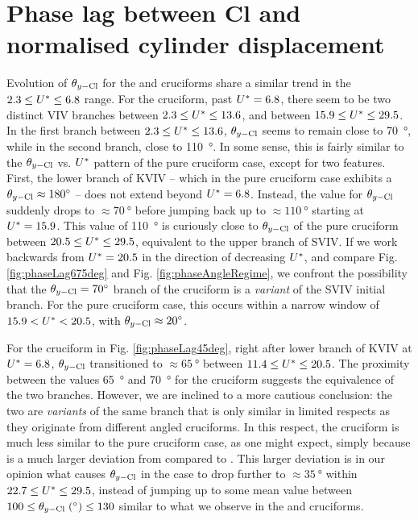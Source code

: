 \documentclass[oneside]{utmthesis}
\begin{document}
\section{Phase lag between Cl and normalised cylinder displacement} \label{sec:phaseLag67545}
Evolution of $\theta_{y-\text{Cl}}$ for the \angfo{} and \angth{} cruciforms share a similar trend in the $2.3 \leq U^{*} \leq 6.8$ range. For the \angfo{} cruciform, past $U^{*} = 6.8$, there seem to be two distinct VIV branches between $2.3 \leq U^{*} \leq 13.6$, and between $15.9 \leq U^{*} \leq 29.5$. In the first branch between $2.3 \leq U^{*} \leq 13.6$, $\theta_{y-\text{Cl}}$ seems to remain close to \SI{70}{\degree}, while in the second branch, close to \SI{110}{\degree}. In some sense, this is fairly similar to the $\theta_{y-\text{Cl}}$ vs. $U^{*}$ pattern of the pure cruciform case, except for two features. First, the lower branch of KVIV -- which in the pure cruciform case exhibits a $\plag \approx \SI{180}{\degree}$ -- does not extend beyond $U^{*} = 6.8$. Instead, the value for $\theta_{y-\text{Cl}}$ suddenly drops to $\approx \SI{70}{\degree}$ before jumping back up to $\approx \SI{110}{\degree}$ starting at $U^{*} = 15.9$. This value of \SI{110}{\degree} is curiously close to $\theta_{y-\text{Cl}}$ of the pure cruciform between $20.5 \leq U^{*} \leq 29.5$, equivalent to the upper branch of SVIV. If we work backwards from $U^{*} = 20.5$ in the direction of decreasing $U^{*}$, and compare Fig. \ref{fig:phaseLag675deg} and Fig. \ref{fig:phaseAngleRegime}, we confront the possibility that the $\plag = \SI{70}{\degree}$ branch of the \angfo cruciform is a \textit{variant} of the SVIV initial branch. For the pure cruciform case, this occurs within a narrow window of $15.9 < U^{*} < 20.5$, with $\plag \approx \SI{20}{\degree}$.

For the \angth{} cruciform in Fig. \ref{fig:phaseLag45deg}, right after lower branch of KVIV at $U^{*} = 6.8$, $\theta_{y-\text{Cl}}$ transitioned to $\approx \SI{65}{\degree}$ between $11.4 \leq U^{*} \leq 20.5$. The proximity between the values \SI{65}{\degree} and \SI{70}{\degree} for the \angfo{} cruciform suggests the equivalence of the two branches. However, we are inclined to a more cautious conclusion: the two are \textit{variants} of the same branch that is only similar in limited respects as they originate from different angled cruciforms. In this respect, the \angth{} cruciform is much less similar to the pure cruciform case, as one might expect, simply because \angth{} is a much larger deviation from \angfi{} compared to \angfo{}. This larger deviation is in our opinion what causes $\theta_{y-\text{Cl}}$ in the \angth{} case to drop further to $\approx \SI{35}{\degree}$ within $22.7 \leq U^{*} \leq 29.5$, instead of jumping up to some mean value between $100 \leq \plag \; (\si{\degree}) \leq 130$ similar to what we observe in the \angfi{} and \angfo{} cruciforms.
\end{document}
